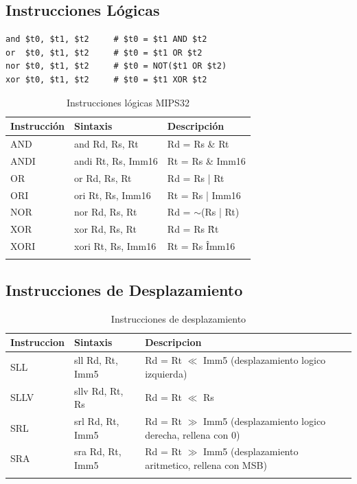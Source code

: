\documentclass[12pt]{article}
\begin{document}
\subsection{Instrucciones Lógicas}

\begin{lstlisting}[caption=Ejemplos de operaciones lógicas, label=lst:logicas]
and $t0, $t1, $t2     # $t0 = $t1 AND $t2
or  $t0, $t1, $t2     # $t0 = $t1 OR $t2
nor $t0, $t1, $t2     # $t0 = NOT($t1 OR $t2)
xor $t0, $t1, $t2     # $t0 = $t1 XOR $t2
\end{lstlisting}

\begin{longtable}{|l|l|l|}
    \hline
    \textbf{Instrucción} & \textbf{Sintaxis} & \textbf{Descripción} \\
    \hline
    AND & and Rd, Rs, Rt & Rd = Rs \& Rt \\
    \hline
    ANDI & andi Rt, Rs, Imm16 & Rt = Rs \& Imm16 \\
    \hline
    OR & or Rd, Rs, Rt & Rd = Rs | Rt \\
    \hline
    ORI & ori Rt, Rs, Imm16 & Rt = Rs | Imm16 \\
    \hline
    NOR & nor Rd, Rs, Rt & Rd = $\sim$(Rs | Rt) \\
    \hline
    XOR & xor Rd, Rs, Rt & Rd = Rs \^ Rt \\
    \hline
    XORI & xori Rt, Rs, Imm16 & Rt = Rs \^ Imm16 \\
    \hline
    \caption{Instrucciones lógicas MIPS32}
\end{longtable}

\subsection{Instrucciones de Desplazamiento}

\begin{longtable}{|l|l|l|}
    \hline
    \textbf{Instruccion} & \textbf{Sintaxis} & \textbf{Descripcion} \\
    \hline
    SLL & sll Rd, Rt, Imm5 & Rd = Rt $\ll$ Imm5 (desplazamiento logico izquierda) \\
    \hline
    SLLV & sllv Rd, Rt, Rs & Rd = Rt $\ll$ Rs \\
    \hline
    SRL & srl Rd, Rt, Imm5 & Rd = Rt $\gg$ Imm5 (desplazamiento logico derecha, rellena con 0) \\
    \hline
    SRA & sra Rd, Rt, Imm5 & Rd = Rt $\gg$ Imm5 (desplazamiento aritmetico, rellena con MSB) \\
    \hline
    \caption{Instrucciones de desplazamiento}
\end{longtable}
\end{document}

